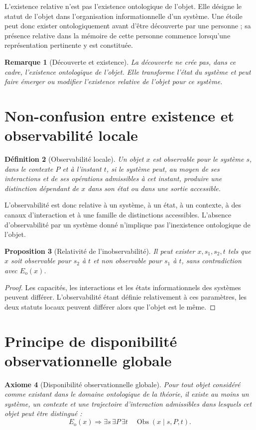 \documentclass[11pt,a4paper,openany]{book}
\newtheorem{definition}{Définition}[chapter]
\newtheorem{axiom}[definition]{Axiome}
\newtheorem{proposition}[definition]{Proposition}
\newtheorem{remark}[definition]{Remarque}
\DeclareMathOperator{\Obs}{Obs}
\begin{document}
L'existence relative n'est pas l'existence ontologique de l'objet. Elle désigne le statut de l'objet dans l'organisation informationnelle d'un système. Une étoile peut donc exister ontologiquement avant d'être découverte par une personne ; sa présence relative dans la mémoire de cette personne commence lorsqu'une représentation pertinente y est constituée.

\begin{remark}[Découverte et existence]
La découverte ne crée pas, dans ce cadre, l'existence ontologique de l'objet. Elle transforme l'état du système et peut faire émerger ou modifier l'existence relative de l'objet pour ce système.
\end{remark}

\section{Non-confusion entre existence et observabilité locale}
\begin{definition}[Observabilité locale]
Un objet $x$ est observable pour le système $s$, dans le contexte $P$ et à l'instant $t$, si le système peut, au moyen de ses interactions et de ses opérations admissibles à cet instant, produire une distinction dépendant de $x$ dans son état ou dans une sortie accessible.
\end{definition}

L'observabilité est donc relative à un système, à un état, à un contexte, à des canaux d'interaction et à une famille de distinctions accessibles. L'absence d'observabilité par un système donné n'implique pas l'inexistence ontologique de l'objet.

\begin{proposition}[Relativité de l'inobservabilité]
Il peut exister $x,s_1,s_2,t$ tels que $x$ soit observable pour $s_2$ à $t$ et non observable pour $s_1$ à $t$, sans contradiction avec $E_{\mathrm{o}}(x)$.
\end{proposition}
\begin{proof}
Les capacités, les interactions et les états informationnels des systèmes peuvent différer. L'observabilité étant définie relativement à ces paramètres, les deux statuts locaux peuvent différer alors que l'objet est le même.\end{proof}

\section{Principe de disponibilité observationnelle globale}
\begin{axiom}[Disponibilité observationnelle globale]
Pour tout objet considéré comme existant dans le domaine ontologique de la théorie, il existe au moins un système, un contexte et une trajectoire d'interaction admissibles dans lesquels cet objet peut être distingué :
\[
E_{\mathrm{o}}(x)\Longrightarrow
\exists s\,\exists P\,\exists t\quad \Obs(x\mid s,P,t).
\]
\end{axiom}
\end{document}
